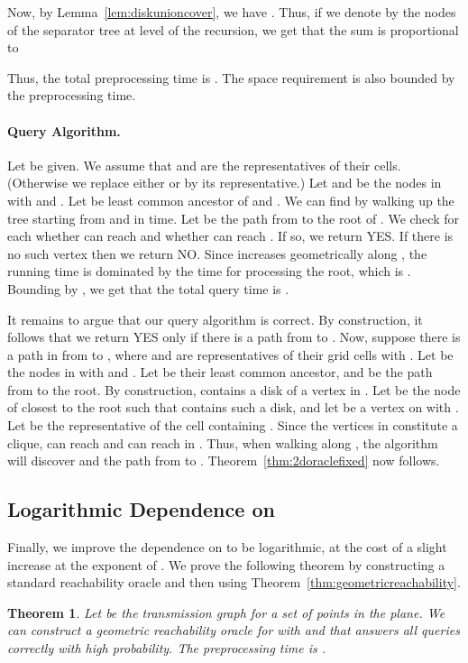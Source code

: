 \documentclass[11pt,a4paper]{paper}
\newtheorem{theorem}{Theorem}[section]
\begin{document}
Now, by Lemma~\ref{lem:diskunioncover}, we have .
Thus, if we denote by  the nodes of the separator tree at level
 of the recursion, we get that
the sum  is proportional to

Thus, the total preprocessing time is
.
The space requirement is also bounded by
the preprocessing time.

\paragraph*{Query Algorithm.}
Let  be given. We assume that  and  are the representatives of their cells. (Otherwise
we replace either  or  by its representative.)
Let  and  be the nodes in  with
 and .
Let  be least common ancestor of  and . We can find  by
 walking up the tree starting from  and  in  time.
Let  be the  path from  to the root
of . We check for each 
whether  can reach  and whether  can reach . If so,
we return YES.
If there is no such vertex
 then we return NO.
Since  increases geometrically along , the running time
is dominated by the time for processing the root, which is
.
Bounding  by ,  we get that the total query time is
.

It remains to argue that our query algorithm is correct.
By construction, it follows
that we return YES only if there is a path from  to .
Now, suppose there is a path  in  from  to ,
where  and  are representatives of their grid cells with .
Let  be the nodes in  with
 and . Let 
be their least common ancestor, and  be the path from 
to the root.
By construction,  contains a disk 
of a vertex  in .
Let  be the node of  closest to the root such that
 contains such a disk, and let  be a vertex on  with
.
Let  be the representative of the cell  containing .
Since the vertices in  constitute a clique,
 can reach  and  can reach  in
.
Thus, when walking along , the algorithm will discover  and
the path from  to .
Theorem~\ref{thm:2doraclefixed} now follows.


\subsection{Logarithmic Dependence on }
\label{sec:psipoly}

Finally, we improve the dependence on  to be logarithmic,
at the cost of a slight increase at the exponent of .
We prove the following theorem by constructing a standard reachability oracle and
then using Theorem~\ref{thm:geometricreachability}.
\begin{theorem}
\label{thm:2doraclebounded}
Let  be the transmission graph for a
set  of  points in the plane.
We can construct a geometric reachability oracle for 
with  and
 that answers all
queries correctly with high probability.
The preprocessing time is
.
\end{theorem}
\end{document}
